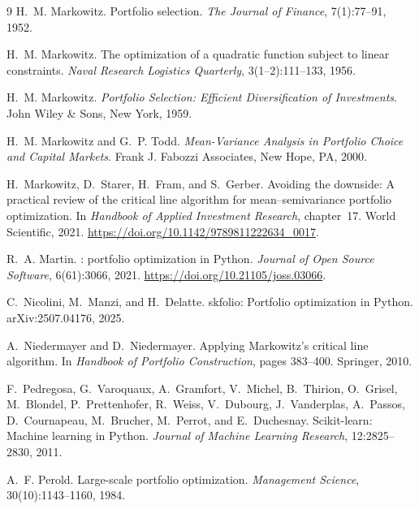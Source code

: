 \documentclass[11pt]{article}
\begin{document}
\begin{thebibliography}{9}
H.~M. Markowitz.
\newblock Portfolio selection.
\newblock \emph{The Journal of Finance}, 7(1):77--91, 1952.

H.~M. Markowitz.
\newblock The optimization of a quadratic function subject to linear constraints.
\newblock \emph{Naval Research Logistics Quarterly}, 3(1--2):111--133, 1956.

H.~M. Markowitz.
\newblock \emph{Portfolio Selection: Efficient Diversification of Investments}.
\newblock John Wiley \& Sons, New York, 1959.

H.~M. Markowitz and G.~P. Todd.
\newblock \emph{Mean-Variance Analysis in Portfolio Choice and Capital Markets}.
\newblock Frank J. Fabozzi Associates, New Hope, PA, 2000.

H.~Markowitz, D.~Starer, H.~Fram, and S.~Gerber.
\newblock Avoiding the downside: A practical review of the critical line
algorithm for mean--semivariance portfolio optimization.
\newblock In \emph{Handbook of Applied Investment Research}, chapter~17. World
Scientific, 2021.
\newblock \url{https://doi.org/10.1142/9789811222634_0017}.

R.~A. Martin.
: portfolio optimization in {Python}.
\newblock \emph{Journal of Open Source Software}, 6(61):3066, 2021.
\newblock \url{https://doi.org/10.21105/joss.03066}.

C.~Nicolini, M.~Manzi, and H.~Delatte.
\newblock skfolio: Portfolio optimization in {Python}.
\newblock arXiv:2507.04176, 2025.

A.~Niedermayer and D.~Niedermayer.
\newblock Applying Markowitz's critical line algorithm.
\newblock In \emph{Handbook of Portfolio Construction}, pages 383--400. Springer, 2010.

F.~Pedregosa, G.~Varoquaux, A.~Gramfort, V.~Michel, B.~Thirion, O.~Grisel,
M.~Blondel, P.~Prettenhofer, R.~Weiss, V.~Dubourg, J.~Vanderplas, A.~Passos,
D.~Cournapeau, M.~Brucher, M.~Perrot, and E.~Duchesnay.
\newblock Scikit-learn: Machine learning in {P}ython.
\newblock \emph{Journal of Machine Learning Research}, 12:2825--2830, 2011.

A.~F. Perold.
\newblock Large-scale portfolio optimization.
\newblock \emph{Management Science}, 30(10):1143--1160, 1984.


\end{thebibliography}
\end{document}
